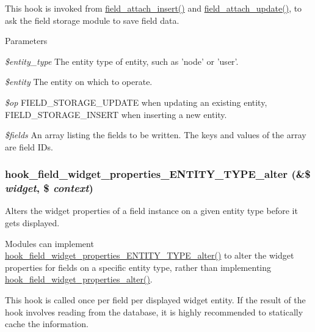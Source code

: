 This hook is invoked from \hyperlink{group__field__attach_gad7c37d577b97db5e0c182bc570ed7cf4}{field\_\-attach\_\-insert()} and \hyperlink{group__field__attach_ga8d15efdca36306ea04552bed4986e77b}{field\_\-attach\_\-update()}, to ask the field storage module to save field data.


\begin{DoxyParams}{Parameters}
\item[{\em \$entity\_\-type}]The entity type of entity, such as 'node' or 'user'. \item[{\em \$entity}]The entity on which to operate. \item[{\em \$op}]FIELD\_\-STORAGE\_\-UPDATE when updating an existing entity, FIELD\_\-STORAGE\_\-INSERT when inserting a new entity. \item[{\em \$fields}]An array listing the fields to be written. The keys and values of the array are field IDs. \end{DoxyParams}
\hypertarget{group__field__storage_gafbf6029d00ade9df41649d247531f3ba}{
\subsubsection[{hook\_\-field\_\-widget\_\-properties\_\-ENTITY\_\-TYPE\_\-alter}]{\setlength{\rightskip}{0pt plus 5cm}hook\_\-field\_\-widget\_\-properties\_\-ENTITY\_\-TYPE\_\-alter (\&\$ {\em widget}, \/  \$ {\em context})}}
\label{group__field__storage_gafbf6029d00ade9df41649d247531f3ba}
Alters the widget properties of a field instance on a given entity type before it gets displayed.

Modules can implement \hyperlink{group__field__storage_gafbf6029d00ade9df41649d247531f3ba}{hook\_\-field\_\-widget\_\-properties\_\-ENTITY\_\-TYPE\_\-alter()} to alter the widget properties for fields on a specific entity type, rather than implementing \hyperlink{group__field__widget_gaa88988bce1ffbec1f481ec7a3ba87e51}{hook\_\-field\_\-widget\_\-properties\_\-alter()}.

This hook is called once per field per displayed widget entity. If the result of the hook involves reading from the database, it is highly recommended to statically cache the information.


